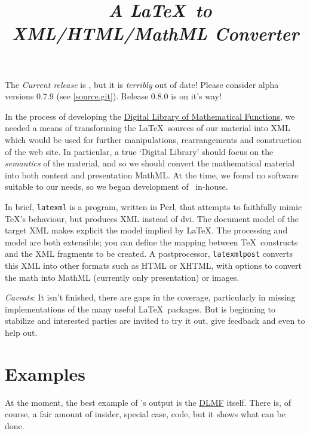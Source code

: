 \documentclass{article}
\title{\LaTeXML\ \emph{A \LaTeX\ to XML/HTML/MathML Converter}}
\begin{document}
\label{top}
\maketitle

The \emph{Current release} is ,
but it is \emph{terribly} out of date!
Please consider alpha versions 0.7.9 (see \ref{source.git}).
Release 0.8.0 is on it's way!

In the process of developing the
\href{http://dlmf.nist.gov/}{Digital Library of Mathematical Functions},
we needed a means of transforming
the \LaTeX\ sources of our material into XML which would be used
for further manipulations, rearrangements and construction of the web site.
In particular, a true `Digital Library' should focus on the \emph{semantics}
of the material, and so we should convert the mathematical material into both
content and presentation MathML.
At the time, we found no software suitable to our needs, so we began
development of \LaTeXML\ in-house.  

In brief, \texttt{latexml} is a program, written in Perl, that attempts to
faithfully mimic \TeX's behaviour, but produces XML instead of dvi.
The document model of the target XML makes explicit the model implied
by \LaTeX.
The processing and model are both extensible; you can define
the mapping between \TeX\ constructs and the XML fragments to be created.
A postprocessor, \texttt{latexmlpost} converts this
XML into other formats such as HTML or XHTML, with options
to convert the math into MathML (currently only presentation) or images.

\emph{Caveats}: It isn't finished, there are gaps in the coverage,
particularly in missing implementations of the many useful \LaTeX\ packages.
But is beginning to stabilize and interested parties
are invited to try it out, give feedback and even to help out.


\section{Examples}\label{examples}
At the moment, the best example of \LaTeXML's output is 
the \href{http://dlmf.nist.gov/}{DLMF} itself.
There is, of course, a fair amount of insider, special case,
code, but it shows what can be done.
\end{document}
